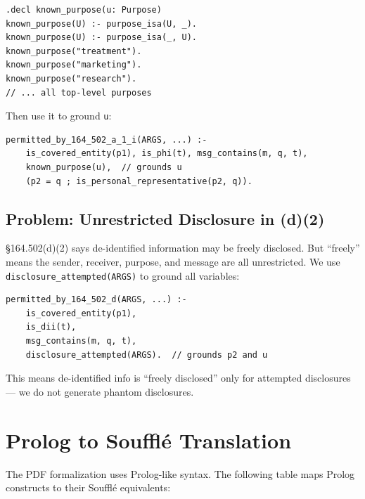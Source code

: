 \documentclass[11pt,letterpaper]{article}
\begin{document}
\begin{lstlisting}[style=soufflestyle]
.decl known_purpose(u: Purpose)
known_purpose(U) :- purpose_isa(U, _).
known_purpose(U) :- purpose_isa(_, U).
known_purpose("treatment").
known_purpose("marketing").
known_purpose("research").
// ... all top-level purposes
\end{lstlisting}

Then use it to ground \texttt{u}:

\begin{lstlisting}[style=soufflestyle]
permitted_by_164_502_a_1_i(ARGS, ...) :-
    is_covered_entity(p1), is_phi(t), msg_contains(m, q, t),
    known_purpose(u),  // grounds u
    (p2 = q ; is_personal_representative(p2, q)).
\end{lstlisting}

\subsection{Problem: Unrestricted Disclosure in (d)(2)}

\S 164.502(d)(2) says de-identified information may be freely disclosed. But ``freely'' means the sender, receiver, purpose, and message are all unrestricted. We use \texttt{disclosure\_attempted(ARGS)} to ground all variables:

\begin{lstlisting}[style=soufflestyle]
permitted_by_164_502_d(ARGS, ...) :-
    is_covered_entity(p1),
    is_dii(t),
    msg_contains(m, q, t),
    disclosure_attempted(ARGS).  // grounds p2 and u
\end{lstlisting}

This means de-identified info is ``freely disclosed'' only for attempted disclosures --- we do not generate phantom disclosures.


\section{Prolog to Souffl\'{e} Translation}
\label{sec:prolog-translation}

The PDF formalization uses Prolog-like syntax. The following table maps Prolog constructs to their Souffl\'{e} equivalents:
\end{document}
